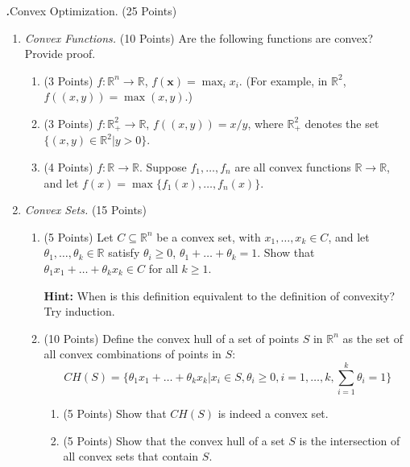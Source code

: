 \documentclass[12pt]{amsart}
\newenvironment{statement}[1]{\smallskip\noindent\color[rgb]{0.0,0.0,0.0} {\bf #1.}}{}
\theoremstyle{definition}
\theoremstyle{remark}
\newcommand{\R}{\mathbb{R}}
\newcommand{\1}{\mathds{1}}
\begin{document}
\begin{statement}{3} \textit{Convex Optimization.} (25 Points) 
\begin{enumerate}
    \item \textit{Convex Functions.} (10 Points) Are the following functions are convex? Provide proof.
    \begin{enumerate}[label=(\alph*)]
        \item (3 Points) $f: \R^n \to \R$, $f(\mathbf{x}) = \max_{i} x_i$. (For example, in $\R^2$, $f((x,y)) = \max(x,y)$.)
        \item (3 Points) $f: \R^2_{+} \to \R$, $f((x,y)) = x/y$, where $\R^2_{+}$ denotes the set $\{(x,y) \in \R^2 | y > 0\}$.
        \item (4 Points) $f: \R \to \R$. Suppose $f_1, \dots, f_n$ are all convex functions $\R \to \R$, and let $f(x) = \max\{f_1(x), \dots, f_n(x)\}$.
\end{enumerate}

\vspace{3mm}

\item \textit{Convex Sets.} (15 Points) \begin{enumerate}
        \item (5 Points) Let $C \subseteq \R^n$ be a convex set, with $x_1, \dots, x_k \in C$, and let $\theta_1, \dots, \theta_k \in \R$ satisfy $\theta_i \ge 0$, $\theta_1 + \dots + \theta_k = 1$. Show that $\theta_1x_1 + \dots + \theta_kx_k \in C$ for all $k \ge 1$.
        
        \noindent\textbf{Hint:} When is this definition equivalent to the definition of convexity? Try induction. 
        
        \item (10 Points) Define the convex hull of a set of points $S$ in $\R^n$ as the set of all convex combinations of points in $S$:
        \[
        CH(S) = \{\theta_1x_1 + \dots + \theta_kx_k | x_i \in S, \theta_i \ge 0, i = 1, \dots, k, \sum_{i=1}^k \theta_i = 1\}
        \]
        \begin{enumerate}
            \item (5 Points) Show that $CH(S)$ is indeed a convex set.
            \item (5 Points) Show that the convex hull of a set $S$ is the intersection of all convex sets that contain $S$.
        \end{enumerate}
    \end{enumerate}
\end{enumerate}
\end{statement}
\end{document}
